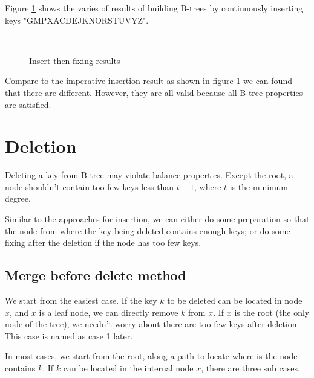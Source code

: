 \documentclass[UTF8]{article}
\begin{document}
Figure \ref{fig:btree-insert-fp} shows the varies of results of building B-trees
by continuously inserting keys "GMPXACDEJKNORSTUVYZ".

\begin{figure}[htbp]
  \centering
   \\
    \caption{Insert then fixing results} \label{fig:btree-insert-fp}
\end{figure}

Compare to the imperative insertion result
as shown in figure \ref{fig:btree-insert-fp}
we can found that there are different. However, they are all valid
because all B-tree properties
are satisfied.


\section{Deletion}

Deleting a key from
B-tree may violate balance properties. Except the root, a node shouldn't
contain too few keys less than $t-1$, where $t$ is the
minimum degree.

Similar to the approaches for insertion, we can either do some preparation
so that the node from where the key being deleted contains enough
keys; or do some fixing after the deletion if the node has too few keys.


\subsection{Merge before delete method}

We start from the easiest case. If the key $k$ to be deleted
can be located in node $x$, and $x$ is a leaf node,
we can directly remove $k$ from $x$. If $x$ is the root (the only
node of the tree), we needn't worry about there are too few
keys after deletion. This case is named as case 1 later.

In most cases, we start from the root, along a path to locate
where is the node contains $k$. If $k$ can be located in the
internal node $x$, there are three sub cases.
\end{document}

